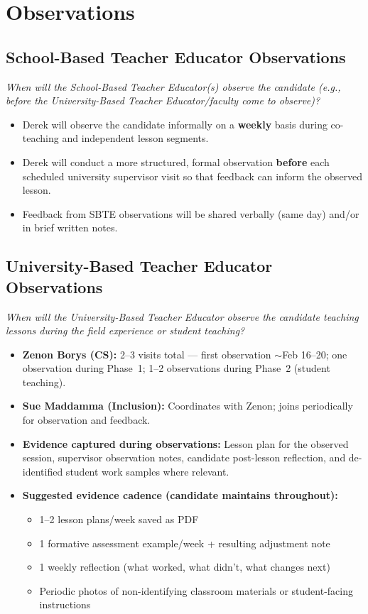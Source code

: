 \documentclass[10pt]{article}
\begin{document}
\section{Observations}

\subsection{School-Based Teacher Educator Observations}
\textit{When will the School-Based Teacher Educator(s) observe the candidate (e.g., before the University-Based Teacher Educator/faculty come to observe)?}

\begin{itemize}[leftmargin=*,itemsep=0.25em]
  \item Derek will observe the candidate informally on a \textbf{weekly} basis during co-teaching and independent lesson segments.
  \item Derek will conduct a more structured, formal observation \textbf{before} each scheduled university supervisor visit so that feedback can inform the observed lesson.
  \item Feedback from SBTE observations will be shared verbally (same day) and/or in brief written notes.
\end{itemize}

\newpage
\subsection{University-Based Teacher Educator Observations}
\textit{When will the University-Based Teacher Educator observe the candidate teaching lessons during the field experience or student teaching?}

\begin{itemize}[leftmargin=*,itemsep=0.25em]
  \item \textbf{Zenon Borys (CS):} 2--3 visits total --- first observation $\sim$Feb 16--20; one observation during Phase~1; 1--2 observations during Phase~2 (student teaching).
  \item \textbf{Sue Maddamma (Inclusion):} Coordinates with Zenon; joins periodically for observation and feedback.
  \item \textbf{Evidence captured during observations:} Lesson plan for the observed session, supervisor observation notes, candidate post-lesson reflection, and de-identified student work samples where relevant.
  \item \textbf{Suggested evidence cadence (candidate maintains throughout):}
  \begin{itemize}[leftmargin=1.5em,itemsep=0.1em]
    \item 1--2 lesson plans/week saved as PDF
    \item 1 formative assessment example/week + resulting adjustment note
    \item 1 weekly reflection (what worked, what didn't, what changes next)
    \item Periodic photos of non-identifying classroom materials or student-facing instructions
  \end{itemize}
\end{itemize}
\end{document}
